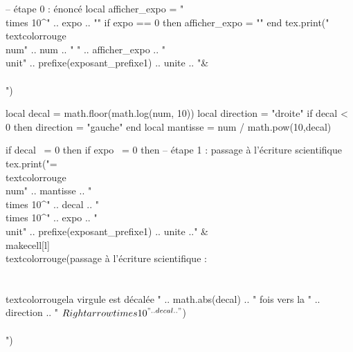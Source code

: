 \documentclass[../Cours.tex]{subfiles}
\begin{document}
\begin{luacode}
        -- étape 0 : énoncé
        local afficher_expo = "\\times 10^{" .. expo .. "}"
        if expo == 0 then afficher_expo = "" end
        tex.print("\\textcolor{rouge}{\\num{" .. num .. "}} " .. afficher_expo .. "~\\unit{" .. prefixe(exposant_prefixe1) .. unite .. "}&\\\\")

        local decal = math.floor(math.log(num, 10))
        local direction = "droite"
        if decal < 0 then direction = "gauche" end 
        local mantisse = num / math.pow(10,decal)

        if decal ~= 0 then
            if expo ~= 0 then
                -- étape 1 : passage à l'écriture scientifique
                tex.print("=\\textcolor{rouge}{\\num{" .. mantisse .. "} \\times 10^{" .. decal .. "}} \\times 10^{" .. expo .. "}~\\unit{" .. prefixe(exposant_prefixe1) .. unite  .."} & \\makecell[l]{\\textcolor{rouge}{(passage à l'écriture scientifique :} \\\\ \\textcolor{rouge}{la virgule est décalée " .. math.abs(decal) .. " fois vers la " .. direction .. " $\\Rightarrow \\times 10^{" .. decal .. "}$)}}\\\\")
        

\end{luacode}
\end{document}
